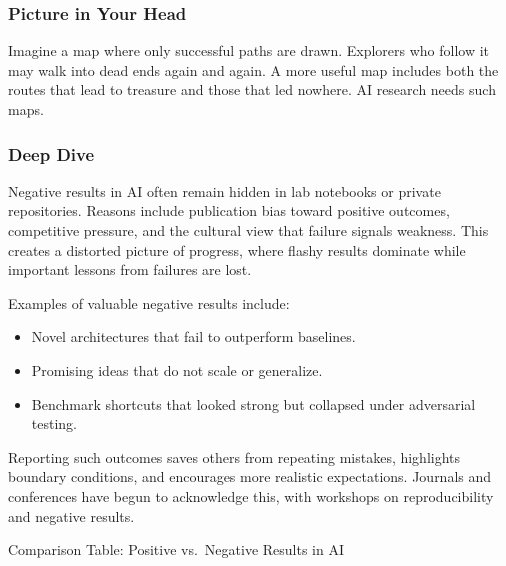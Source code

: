 \documentclass[
  letterpaper,
  DIV=11,
  numbers=noendperiod]{scrreprt}
\providecommand{\tightlist}{%
  \setlength{\itemsep}{0pt}\setlength{\parskip}{0pt}}
\begin{document}
\subsubsection{Picture in Your Head}\label{picture-in-your-head-96}

Imagine a map where only successful paths are drawn. Explorers who
follow it may walk into dead ends again and again. A more useful map
includes both the routes that lead to treasure and those that led
nowhere. AI research needs such maps.

\subsubsection{Deep Dive}\label{deep-dive-96}

Negative results in AI often remain hidden in lab notebooks or private
repositories. Reasons include publication bias toward positive outcomes,
competitive pressure, and the cultural view that failure signals
weakness. This creates a distorted picture of progress, where flashy
results dominate while important lessons from failures are lost.

Examples of valuable negative results include:

\begin{itemize}
\tightlist
\item
  Novel architectures that fail to outperform baselines.
\item
  Promising ideas that do not scale or generalize.
\item
  Benchmark shortcuts that looked strong but collapsed under adversarial
  testing.
\end{itemize}

Reporting such outcomes saves others from repeating mistakes, highlights
boundary conditions, and encourages more realistic expectations.
Journals and conferences have begun to acknowledge this, with workshops
on reproducibility and negative results.

Comparison Table: Positive vs.~Negative Results in AI
\end{document}
